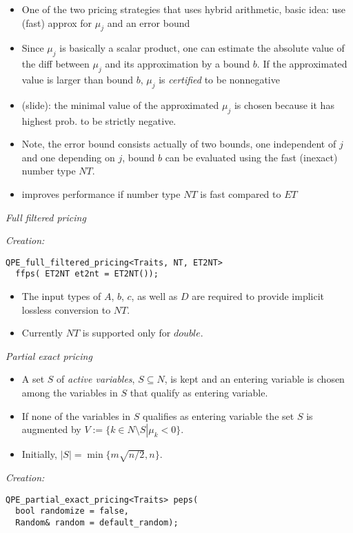 \documentclass{slides}
\begin{document}
\begin{note}
\begin{itemize}
\item One of the two pricing strategies that uses hybrid arithmetic,
basic idea: use (fast) approx for $\mu_{j}$ and an error bound
\item Since $\mu_{j}$ is basically a scalar product, one can estimate the 
absolute value of the diff between $\mu_{j}$ and its approximation by a bound
$b$. If the approximated value is larger than bound $b$, $\mu_{j}$ is
\emph{certified} to be nonnegative
\item (slide): the minimal value of the approximated $\mu_{j}$ is chosen because
it has highest prob. to be strictly negative.
\item Note, the error bound consists actually of two bounds, one
independent of $j$ and one depending on $j$, bound $b$ can be evaluated
using the fast (inexact) number type $NT$.
\item improves performance if number type $NT$ is fast compared to $ET$
\end{itemize}
\end{note}


\begin{slide}
\emph{Full filtered pricing}

\emph{Creation:}
\begin{verbatim}
QPE_full_filtered_pricing<Traits, NT, ET2NT>
  ffps( ET2NT et2nt = ET2NT());
\end{verbatim}
\end{slide}

\begin{note}
\begin{itemize}
\item The input types of $A$, $b$, $c$, as well as $D$ are required to provide
implicit lossless conversion to $NT$.
\item Currently $NT$ is supported only for $double$.
\end{itemize}
\end{note}

\begin{slide}
\emph{Partial exact pricing}

\begin{itemize}
\item A set $S$ of \emph{active variables}, $S \subseteq N$, is kept
and an entering variable is chosen among the variables in $S$ that
qualify as entering variable.

\item If none of the variables in $S$ qualifies as entering variable
the set $S$ is augmented by
$V:=\{k \in N \setminus S \left|\right. \mu_{k} < 0\}$.

\item Initially, $\left|S\right|=\min\{m\sqrt{n/2}, n\}$.
\end{itemize}


\emph{Creation:}
\begin{verbatim}
QPE_partial_exact_pricing<Traits> peps(
  bool randomize = false, 
  Random& random = default_random);
\end{verbatim}
\end{slide}
\end{document}
